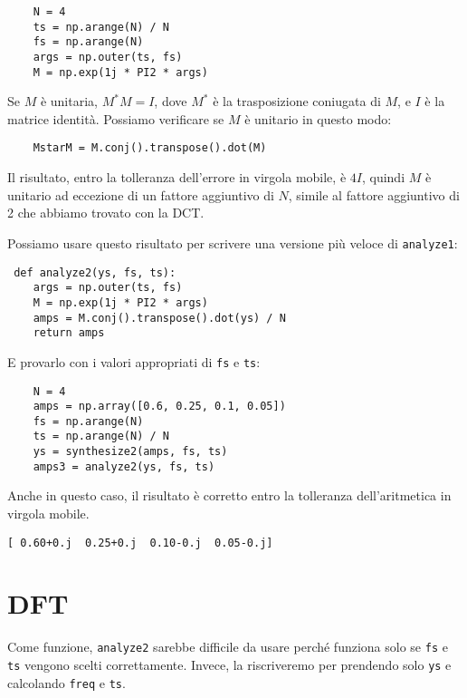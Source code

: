 \documentclass[12pt,a4paper]{book}
\begin{document}
\begin{verbatim} 
    N = 4
    ts = np.arange(N) / N
    fs = np.arange(N)
    args = np.outer(ts, fs)
    M = np.exp(1j * PI2 * args)
 \end{verbatim} 

Se $M$ è unitaria, $M^*M = I$, dove $M^*$ è la trasposizione coniugata di $M$, e $I$ è la matrice identità. Possiamo verificare se $M$ è unitario in questo modo:

\begin{verbatim} 
    MstarM = M.conj().transpose().dot(M)
 \end{verbatim} 

Il risultato, entro la tolleranza dell'errore in virgola mobile, è $4 I$, quindi $M$ è unitario ad eccezione di un fattore aggiuntivo di $N$, simile al fattore aggiuntivo di 2 che abbiamo trovato con la DCT.

Possiamo usare questo risultato per scrivere una versione più veloce di {\tt analyze1}:

\begin{verbatim} def analyze2(ys, fs, ts):
    args = np.outer(ts, fs)
    M = np.exp(1j * PI2 * args)
    amps = M.conj().transpose().dot(ys) / N
    return amps
 \end{verbatim} 

E provarlo con i valori appropriati di {\tt fs} e {\tt ts}:

\begin{verbatim} 
    N = 4
    amps = np.array([0.6, 0.25, 0.1, 0.05])
    fs = np.arange(N)
    ts = np.arange(N) / N
    ys = synthesize2(amps, fs, ts)
    amps3 = analyze2(ys, fs, ts)
 \end{verbatim} 

Anche in questo caso, il risultato è corretto entro la tolleranza dell'aritmetica in virgola mobile.

\begin{verbatim} 
[ 0.60+0.j  0.25+0.j  0.10-0.j  0.05-0.j]
 \end{verbatim} 

\section{DFT} \label{dftsection} 

Come funzione, {\tt analyze2} sarebbe difficile da usare perché funziona solo se {\tt fs} e {\tt ts} vengono scelti correttamente. Invece, la riscriveremo per prendendo solo {\tt ys} e calcolando {\tt freq} e {\tt ts}.
\end{document}
